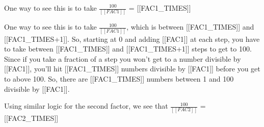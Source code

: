 \documentclass{article}
\begin{document}
\begin{itemize}
                                One way to see this is to take  $\frac{100}{[[FAC1]]}$ = [[FAC1\_TIMES]]
                            
                            
                                One way to see this is to take  $\frac{100}{[[FAC1]]}$, which is between [[FAC1\_TIMES]] and [[FAC1\_TIMES+1]]. So, starting at 0 and adding [[FAC1]]
                                at each step, you have to take between [[FAC1\_TIMES]] and [[FAC1\_TIMES+1]] steps to get
                                to 100. Since if you take a fraction of a step you won't get to a number divisible by [[FAC1]],
                                you'll hit [[FAC1\_TIMES]] numbers divisible by [[FAC1]] before you get to above 100.
                                So, there are [[FAC1\_TIMES]] numbers between 1 and 100 divisible by [[FAC1]].
                            
                            
                            
                                Using similar logic for the second factor, we see that  $\frac{100}{[[FAC2]]}$ = [[FAC2\_TIMES]]
                            

\end{itemize}
\end{document}
